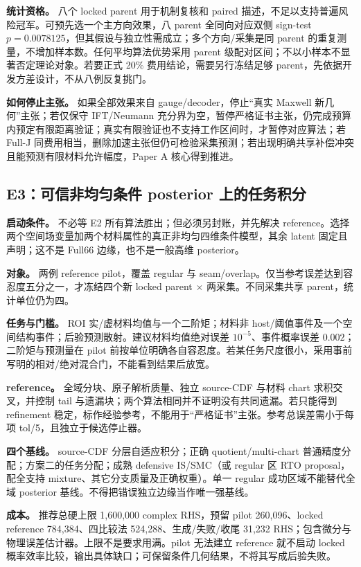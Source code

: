 \textbf{统计资格。} 八个 locked parent 用于机制复核和 paired 描述，不足以支持普遍风险冠军。可预先选一个主方向效果，八 parent 全同向对应双侧 sign-test $p=0.0078125$，但其假设与独立性需成立；多个方向/采集是同 parent 的重复测量，不增加样本数。任何平均算法优势采用 parent 级配对区间；不以小样本不显著否定理论对象。若要正式 20\% 费用结论，需要另行冻结足够 parent，先依据开发方差设计，不从八例反复挑门。

\textbf{如何停止主张。} 如果全部效果来自 gauge/decoder，停止“真实 Maxwell 新几何”主张；若仅保守 IFT/Neumann 充分界为空，暂停严格证书主张，仍完成预算内预定有限距离验证；真实有限验证也不支持工作区间时，才暂停对应算法；若 Full-J 同费用相当，删除加速主张但仍可检验采集预测；若出现明确共享补偿冲突且能预测有限材料允许幅度，Paper A 核心得到推进。

\subsection{E3：可信非均匀条件 posterior 上的任务积分}
\textbf{启动条件。} 不必等 E2 所有算法胜出；但必须另封账，并先解决 reference。选择两个空间场变量加两个材料属性的真正非均匀四维条件模型，其余 latent 固定且声明；这不是 Full66 边缘，也不是一般高维 posterior。

\textbf{对象。} 两例 reference pilot，覆盖 regular 与 seam/overlap。仅当参考误差达到容忍度五分之一，才冻结四个新 locked parent $\times$ 两采集。不同采集共享 parent，统计单位仍为四。

\textbf{任务与门槛。} ROI 实/虚材料均值与一个二阶矩；材料非 host/阈值事件及一个空间结构事件；后验预测散射。建议材料均值绝对误差 $10^{-5}$、事件概率误差 $0.002$；二阶矩与预测量在 pilot 前按单位明确各自容忍度。若某任务尺度很小，采用事前写明的相对/绝对混合门，不能看到结果后放宽。

\textbf{reference。} 全域分块、原子解析质量、独立 source-CDF 与材料 chart 求积交叉，并控制 tail 与遗漏块；两个算法相同并不证明没有共同遗漏。若只能得到 refinement 稳定，标作经验参考，不能用于“严格证书”主张。参考总误差需小于每项 tol/5，且独立于候选停止器。

\textbf{四个基线。} source-CDF 分层自适应积分；正确 quotient/multi-chart 普通精度分配；方案二的任务分配；成熟 defensive IS/SMC（或 regular 区 RTO proposal，配全支持 mixture、其它分支质量及正确权重）。单一 regular 成功区域不能替代全域 posterior 基线。不得把错误独立边缘当作唯一强基线。

\textbf{成本。} 推荐总硬上限 1,600,000 complex RHS，预留 pilot 260,096、locked reference 784,384、四比较法 524,288、生成/失败/收尾 31,232 RHS；包含微分与物理误差估计器。上限不是要求用满。pilot 无法建立 reference 就不启动 locked 概率效率比较，输出具体缺口；可保留条件几何结果，不将其写成后验失败。

